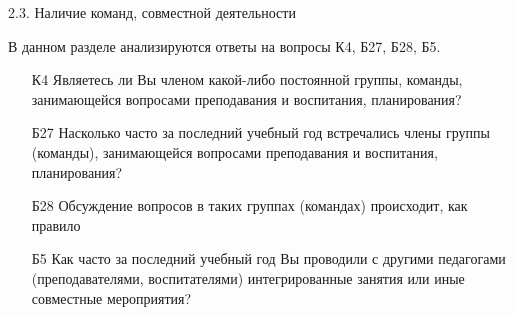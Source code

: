 \begin{frame}{2.3. Наличие команд, совместной деятельности}

\tiny

В данном разделе анализируются ответы на вопросы К4, Б27, Б28, Б5.
\bigskip

\begin{itemize}

\item [К4] Являетесь ли Вы членом какой-либо постоянной группы, команды, занимающейся вопросами преподавания и воспитания, планирования?

\item [Б27] Насколько часто за последний учебный год встречались члены группы (команды), занимающейся вопросами преподавания и воспитания, планирования?

\item [Б28] Обсуждение вопросов в таких группах (командах) происходит, как правило

\item [Б5] Как часто за последний учебный год  Вы проводили с другими педагогами  (преподавателями, воспитателями) интегрированные занятия или иные совместные мероприятия?

\end{itemize}

\end{frame}


